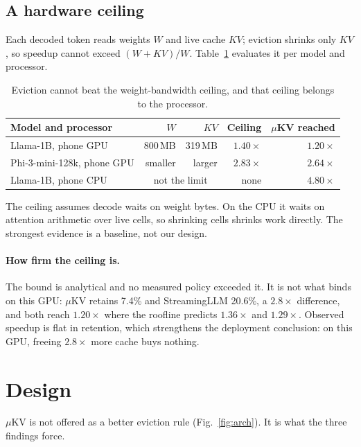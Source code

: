\documentclass[11pt]{article}
\begin{document}
\subsection{A hardware ceiling}
Each decoded token reads weights $W$ and live cache $KV$; eviction shrinks only $KV$, so
speedup cannot exceed $(W{+}KV)/W$. Table~\ref{tab:ceiling} evaluates it per model and processor.

\begin{table}[h]\centering\small
\caption{Eviction cannot beat the weight-bandwidth ceiling, and that ceiling belongs to the processor.}
\label{tab:ceiling}
\begin{tabular}{@{}lrrrr@{}}
\toprule
\textbf{Model and processor} & $W$ & $KV$ & \textbf{Ceiling} & \textbf{$\mu$KV reached}\\
\midrule
Llama-1B, phone GPU & 800\,MB & 319\,MB & $1.40\times$ & $1.20\times$\\
Phi-3-mini-128k, phone GPU & smaller & larger & $2.83\times$ & $2.64\times$\\
\rowcolor{cA!8} Llama-1B, phone CPU & \multicolumn{2}{c}{not the limit} & none & $4.80\times$\\
\bottomrule
\end{tabular}
\end{table}

\noindent The ceiling assumes decode waits on weight bytes. On the CPU it waits on attention
arithmetic over live cells, so shrinking cells shrinks work directly. The strongest evidence
is a baseline, not our design.



\paragraph{How firm the ceiling is.} The bound is analytical and no measured policy exceeded
it. It is not what binds on this GPU: $\mu$KV retains 7.4\% and StreamingLLM 20.6\%, a
$2.8\times$ difference, and both reach $1.20\times$ where the roofline predicts $1.36\times$
and $1.29\times$. Observed speedup is flat in retention, which strengthens the deployment
conclusion: on this GPU, freeing $2.8\times$ more cache buys nothing.

\section{Design}
$\mu$KV is not offered as a better eviction rule (Fig.~\ref{fig:arch}). It is what the three findings force.
\end{document}

